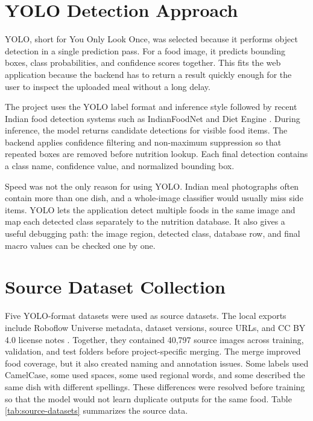 \section{YOLO Detection Approach}

YOLO, short for You Only Look Once, was selected because it performs object detection in a single prediction pass. For a food image, it predicts bounding boxes, class probabilities, and confidence scores together. This fits the web application because the backend has to return a result quickly enough for the user to inspect the uploaded meal without a long delay.

The project uses the YOLO label format and inference style followed by recent Indian food detection systems such as IndianFoodNet and Diet Engine \cite{indianfoodnet_2023,diet_engine_2025}. During inference, the model returns candidate detections for visible food items. The backend applies confidence filtering and non-maximum suppression so that repeated boxes are removed before nutrition lookup. Each final detection contains a class name, confidence value, and normalized bounding box.

Speed was not the only reason for using YOLO. Indian meal photographs often contain more than one dish, and a whole-image classifier would usually miss side items. YOLO lets the application detect multiple foods in the same image and map each detected class separately to the nutrition database. It also gives a useful debugging path: the image region, detected class, database row, and final macro values can be checked one by one.

\section{Source Dataset Collection}

Five YOLO-format datasets were used as source datasets. The local exports include Roboflow Universe metadata, dataset versions, source URLs, and CC BY 4.0 license notes \cite{dataset_indian_food_detection_v1,dataset_indian_food_v6,dataset_indianfood_7_v2,dataset_indianfoodnet_30_v1,dataset_south_indian_food_v19}. Together, they contained 40,797 source images across training, validation, and test folders before project-specific merging. The merge improved food coverage, but it also created naming and annotation issues. Some labels used CamelCase, some used spaces, some used regional words, and some described the same dish with different spellings. These differences were resolved before training so that the model would not learn duplicate outputs for the same food. Table \ref{tab:source-datasets} summarizes the source data.

